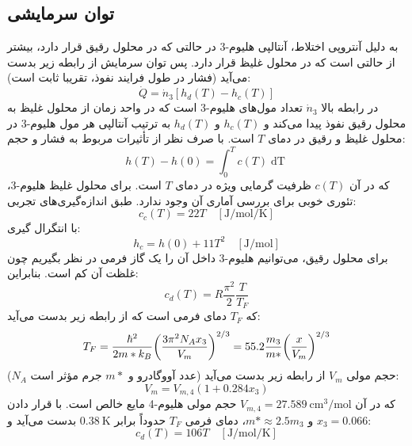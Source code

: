 \documentclass[12pt,a4paper]{article}
\begin{document}
	\subsection{توان سرمایشی}
	به دلیل آنتروپی اختلاط، آنتالپی هلیوم-3 در حالتی که در محلول رقیق قرار دارد، بیشتر از حالتی است که در محلول غلیظ قرار دارد.
	پس توان سرمایش از رابطه زیر بدست می‌آید (فشار در طول فرایند نفوذ، تقریبا ثابت است):
	\begin{equation} \label{power}
		\dot{Q}=\dot{n}_3[h_d(T) - h_c(T)]
	\end{equation}
	در رابطه بالا $\dot{n}_3 $ تعداد مول‌های هلیوم-3 است که در واحد زمان از محلول غلیظ به محلول رقیق نفوذ پیدا می‌کند
	و $h_c(T)$ و $h_d(T)$ به ترتیب آنتالپی هر مول هلیوم-3 در محلول غلیظ و رقیق در دمای $T$ است. با صرف نظر از تأثیرات مربوط به فشار و حجم:
	\begin{equation}
		h(T) - h(0) = \int_0^T c(T)\mathop{dT}
	\end{equation}
	که در آن $c(T)$ ظرفیت گرمایی ویژه در دمای $T$ است. برای محلول غلیظ هلیوم-3، تئوری خوبی برای بررسی آماری آن وجود ندارد. طبق اندازه‌گیری‌های تجربی:
	\begin{equation}
		c_c(T)=22T \quad [\si{\joule\per\mole\per\kelvin}]
	\end{equation}
	با انتگرال گیری:
	\begin{equation} \label{h_c}
		h_c = h(0) + 11T^2 \quad [\si{\joule\per\mole}]
	\end{equation}
	برای محلول رقیق، می‌توانیم هلیوم-3 داخل آن را یک گاز فرمی در نظر بگیریم چون غلظت آن کم است. بنابراین:
	\begin{equation}
		c_d(T) = R\frac{\pi^2}{2}\frac{T}{T_F}
	\end{equation}
	که $T_F$ دمای فرمی است که از رابطه زیر بدست می‌آید:
	\begin{equation}
		T_F = \frac{\hbar^2}{2m*k_B}\qty(\frac{3\pi^2 N_A x_3}{V_m})^{2/3} = 55.2\frac{m_3}{m*}\qty(\frac{x}{V_m})^{2/3}
	\end{equation}
	($N_A$ عدد آووگادرو و $m*$ جرم مؤثر است) حجم مولی $V_m$ از رابطه زیر بدست می‌آید:
	\begin{equation}
		V_m = V_{m, 4}(1+0.284x_3)
	\end{equation}
	که در آن $V_{m, 4} = \SI{27.589}{\centi\meter\cubed\per\mole} $ حجم مولی هلیوم-4 مایع خالص است. با قرار دادن $x_3=0.066 $ و $m* \approx 2.5m_3 $،
	دمای فرمی $T_F$ حدوداً برابر $\SI{0.38}{\kelvin}$ بدست می‌آید و:
	\begin{equation}
		c_d(T) = 106 T \quad [\si{\joule\per\mole\per\kelvin}]
	\end{equation}
\end{document}
